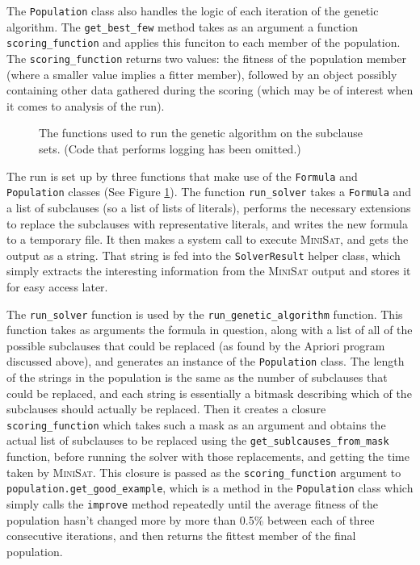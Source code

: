 \documentclass[proof,pdftex,11pt,a4,titlepage]{article}
\def\code{\lstinline[basicstyle=\textsize\ttfamily]}
\begin{document}
The \code{Population} class also handles the logic of each iteration of the genetic algorithm. The \code{get_best_few} method takes as an argument a function \code{scoring_function} and applies this funciton to each member of the population. The \code{scoring_function} returns two values: the fitness of the population member (where a smaller value implies a fitter member), followed by an object possibly containing other data gathered during the scoring (which may be of interest when it comes to analysis of the run).

\begin{figure}[h]
  
  \caption{The functions used to run the genetic algorithm on the subclause sets. (Code that performs logging has been omitted.)}
  \label{fig:run-functions}
\end{figure}

The run is set up by three functions that make use of the \code{Formula} and \code{Population} classes (See Figure \ref{fig:run-functions}). The function \code{run_solver} takes a \code{Formula} and a list of subclauses (so a list of lists of literals), performs the necessary extensions to replace the subclauses with representative literals, and writes the new formula to a temporary file. It then makes a system call to execute \textsc{MiniSat}, and gets the output as a string. That string is fed into the \code{SolverResult} helper class, which simply extracts the interesting information from the \textsc{MiniSat} output and stores it for easy access later.

The \code{run_solver} function is used by the \code{run_genetic_algorithm} function. This function takes as arguments the formula in question, along with a list of all of the possible subclauses that could be replaced (as found by the Apriori program discussed above), and generates an instance of the \code{Population} class. The length of the strings in the population is the same as the number of subclauses that could be replaced, and each string is essentially a bitmask describing which of the subclauses should actually be replaced. Then it creates a closure \code{scoring_function} which takes such a mask as an argument and obtains the actual list of subclauses to be replaced using the \code{get_sublcauses_from_mask} function, before running the solver with those replacements, and getting the time taken by \textsc{MiniSat}. This closure is passed as the \code{scoring_function} argument to \code{population.get_good_example}, which is a method in the \code{Population} class which simply calls the \code{improve} method repeatedly until the average fitness of the population hasn't changed more by more than 0.5\% between each of three consecutive iterations, and then returns the fittest member of the final population.
\end{document}
